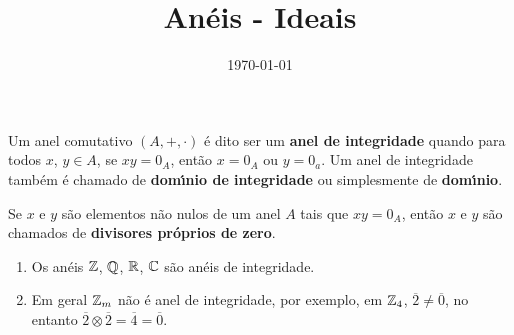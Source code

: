 \documentclass{beamer}
\title{Anéis - Ideais}
\author[\autor]{\autor}
\institute[\instituto]{\instituto}
\date{\today}
\begin{document}
    \begin{frame}
        \maketitle
    \end{frame}

    \begin{frame}
        \begin{definicao}
            Um anel comutativo $(A, + , \cdot)$ {\'e} dito ser um \textbf{anel de integridade} quando para todos 
            $x$, $y \in A$, se $xy = 0_A$, ent{\~a}o $x = 0_A$ ou $y = 0_a$. Um anel de integridade tamb{\'e}m {\'e} chamado de \textbf{dom{\'\i}nio de integridade} ou simplesmente de \textbf{dom{\'\i}nio}.
        \end{definicao}

        \begin{observacao}
            Se $x$ e $y$ s{\~a}o elementos n{\~a}o nulos de um anel $A$ tais que $xy = 0_A$, ent{\~a}o $x$ e $y$ s{\~a}o chamados de \textbf{divisores pr{\'o}prios de zero}.
        \end{observacao}
    \end{frame}

    \begin{frame}
        \begin{exemplos}
            \begin{enumerate}[label={\arabic*})]
                \item Os an{\'e}is $\mathbb{Z}$, $\mathbb{Q}$, $\mathbb{R}$, $\mathbb{C}$ s{\~a}o an{\'e}is de integridade.
                
                \vspace{.5cm}

                \item Em geral $\mathbb{Z}_m$ n{\~a}o {\'e} anel de integridade, por exemplo, em $\mathbb{Z}_4$, $\overline{2} \neq \overline{0}$, no entanto $\overline{2}\otimes \overline{2} = \overline{4} = \overline{0}$.

                \vspace{.5cm}

                \seti
            \end{enumerate}
        \end{exemplos}
    \end{frame}
\end{document}
